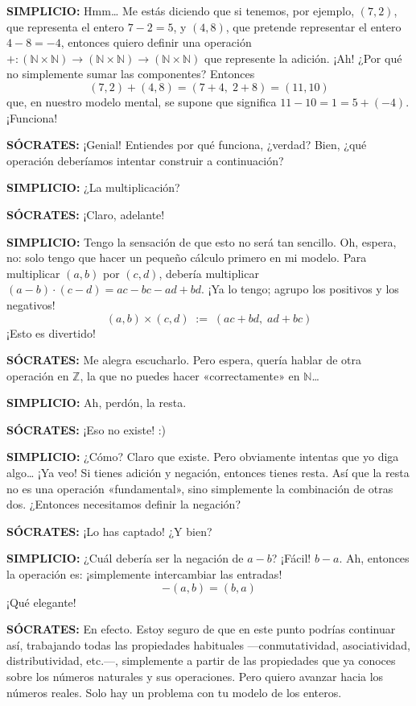 \medskip
\noindent\textbf{SIMPLICIO:} Hmm\ldots{} Me estás diciendo que si tenemos, por ejemplo, $(7, 2)$, que representa el entero $7 - 2 = 5$, y $(4, 8)$, que pretende representar el entero $4 - 8 = -4$, entonces quiero definir una operación $+: (\mathbb{N} \times \mathbb{N}) \to (\mathbb{N} \times \mathbb{N}) \to (\mathbb{N} \times \mathbb{N})$ que represente la adición. ¡Ah! ¿Por qué no simplemente sumar las componentes? Entonces
\[
  (7, 2) + (4, 8) = (7+4,\; 2+8) = (11, 10)
\]
que, en nuestro modelo mental, se supone que significa $11 - 10 = 1 = 5 + (-4)$. ¡Funciona!

\medskip
\noindent\textbf{SÓCRATES:} ¡Genial! Entiendes por qué funciona, ¿verdad? Bien, ¿qué operación deberíamos intentar construir a continuación?

\medskip
\noindent\textbf{SIMPLICIO:} ¿La multiplicación?

\medskip
\noindent\textbf{SÓCRATES:} ¡Claro, adelante!

\medskip
\noindent\textbf{SIMPLICIO:} Tengo la sensación de que esto no será tan sencillo. Oh, espera, no: solo tengo que hacer un pequeño cálculo primero en mi modelo. Para multiplicar $(a, b)$ por $(c, d)$, debería multiplicar $(a - b) \cdot (c - d) = ac - bc - ad + bd$. ¡Ya lo tengo; agrupo los positivos y los negativos!
\[
  (a, b) \times (c, d) \;:=\; (ac + bd,\; ad + bc)
\]
¡Esto es divertido!

\medskip
\noindent\textbf{SÓCRATES:} Me alegra escucharlo. Pero espera, quería hablar de otra operación en $\mathbb{Z}$, la que no puedes hacer «correctamente» en $\mathbb{N}$\ldots

\medskip
\noindent\textbf{SIMPLICIO:} Ah, perdón, la resta.

\medskip
\noindent\textbf{SÓCRATES:} ¡Eso no existe! :)

\medskip
\noindent\textbf{SIMPLICIO:} ¿Cómo? Claro que existe. Pero obviamente intentas que yo diga algo\ldots{} ¡Ya veo! Si tienes adición y negación, entonces tienes resta. Así que la resta no es una operación «fundamental», sino simplemente la combinación de otras dos. ¿Entonces necesitamos definir la negación?

\medskip
\noindent\textbf{SÓCRATES:} ¡Lo has captado! ¿Y bien?

\medskip
\noindent\textbf{SIMPLICIO:} ¿Cuál debería ser la negación de $a - b$? ¡Fácil! $b - a$. Ah, entonces la operación es: ¡simplemente intercambiar las entradas!
\[
  -(a, b) = (b, a)
\]
¡Qué elegante!

\medskip
\noindent\textbf{SÓCRATES:} En efecto. Estoy seguro de que en este punto podrías continuar así, trabajando todas las propiedades habituales —conmutatividad, asociatividad, distributividad, etc.—, simplemente a partir de las propiedades que ya conoces sobre los números naturales y sus operaciones. Pero quiero avanzar hacia los números reales. Solo hay un problema con tu modelo de los enteros.

